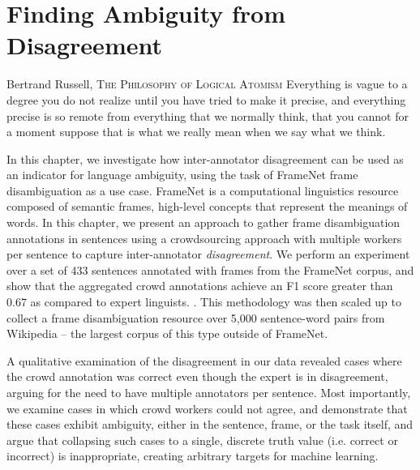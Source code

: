 \chapter{Finding Ambiguity from Disagreement}
\label{chap:frames}




\begin{chapquote}{Bertrand Russell, \textsc{The Philosophy of Logical Atomism}}
Everything is vague to a degree you do not realize until you have tried to make it precise, and everything precise is so remote from everything that we normally think, that you cannot for a moment suppose that is what we really mean when we say what we think.
\end{chapquote}


In this chapter, we investigate how inter-annotator disagreement can be used as an indicator for language ambiguity, using the task of FrameNet frame disambiguation as a use case. FrameNet is a computational linguistics resource composed of semantic frames, high-level concepts that represent the meanings of words. In this chapter, we present an approach to gather frame disambiguation annotations in sentences using a crowdsourcing approach with multiple workers per sentence to capture inter-annotator \emph{disagreement}. We perform an experiment over a set of 433 sentences annotated with frames from the FrameNet corpus, and show that the aggregated crowd annotations achieve an F1 score greater than 0.67 as compared to expert linguists. . This methodology was then scaled up to collect a frame disambiguation resource over 5,000 sentence-word pairs from Wikipedia -- the largest corpus of this type outside of FrameNet.

A qualitative examination of the disagreement in our data revealed cases where the crowd annotation was correct even though the expert is in disagreement, arguing for the need to have multiple annotators per sentence. Most importantly, we examine cases in which crowd workers could not agree, and demonstrate that these cases exhibit ambiguity, either in the sentence, frame, or the task itself, and argue that collapsing such cases to a single, discrete truth value (i.e. correct or incorrect) is inappropriate, creating arbitrary targets for machine learning.

